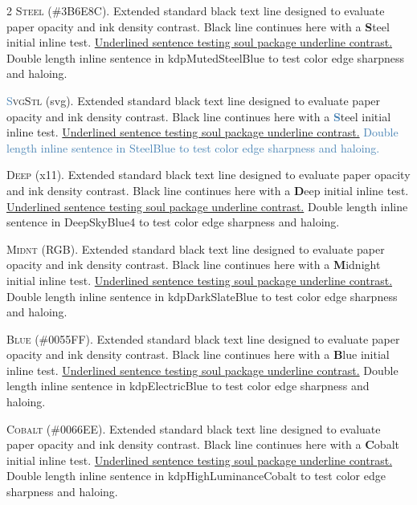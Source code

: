 \documentclass[9pt]{article}
\let\oldlettrine\lettrine
\renewcommand{\lettrine}[3][]{%
	\clubpenalty=10000
	\oldlettrine[#1]{#2}{#3}%
}
\begin{document}
\begin{multicols}{2}
\lettrine[lines=2]{\textcolor{kdpMutedSteelBlue}{S}}{teel} (\#3B6E8C). Extended standard black text line designed to evaluate paper opacity and ink density contrast. Black line continues here with a \textbf{\textcolor{kdpMutedSteelBlue}{S}}teel initial inline test. \ul{Underlined sentence testing soul package underline contrast.} \textcolor{kdpMutedSteelBlue}{Double length inline sentence in kdpMutedSteelBlue to test color edge sharpness and haloing.}
\medskip

\lettrine[lines=2]{\textcolor{SteelBlue}{S}}{vgStl} (svg). Extended standard black text line designed to evaluate paper opacity and ink density contrast. Black line continues here with a \textbf{\textcolor{SteelBlue}{S}}teel initial inline test. \ul{Underlined sentence testing soul package underline contrast.} \textcolor{SteelBlue}{Double length inline sentence in SteelBlue to test color edge sharpness and haloing.}
\medskip

\lettrine[lines=2]{\textcolor{DeepSkyBlue4}{D}}{eep} (x11). Extended standard black text line designed to evaluate paper opacity and ink density contrast. Black line continues here with a \textbf{\textcolor{DeepSkyBlue4}{D}}eep initial inline test. \ul{Underlined sentence testing soul package underline contrast.} \textcolor{DeepSkyBlue4}{Double length inline sentence in DeepSkyBlue4 to test color edge sharpness and haloing.}
\medskip

\lettrine[lines=2]{\textcolor{kdpDarkSlateBlue}{M}}{idnt} (RGB). Extended standard black text line designed to evaluate paper opacity and ink density contrast. Black line continues here with a \textbf{\textcolor{kdpDarkSlateBlue}{M}}idnight initial inline test. \ul{Underlined sentence testing soul package underline contrast.} \textcolor{kdpDarkSlateBlue}{Double length inline sentence in kdpDarkSlateBlue to test color edge sharpness and haloing.}
\medskip

\lettrine[lines=2]{\textcolor{kdpElectricBlue}{B}}{lue} (\#0055FF). Extended standard black text line designed to evaluate paper opacity and ink density contrast. Black line continues here with a \textbf{\textcolor{kdpElectricBlue}{B}}lue initial inline test. \ul{Underlined sentence testing soul package underline contrast.} \textcolor{kdpElectricBlue}{Double length inline sentence in kdpElectricBlue to test color edge sharpness and haloing.}
\medskip

\lettrine[lines=2]{\textcolor{kdpHighLuminanceCobalt}{C}}{obalt} (\#0066EE). Extended standard black text line designed to evaluate paper opacity and ink density contrast. Black line continues here with a \textbf{\textcolor{kdpHighLuminanceCobalt}{C}}obalt initial inline test. \ul{Underlined sentence testing soul package underline contrast.} \textcolor{kdpHighLuminanceCobalt}{Double length inline sentence in kdpHighLuminanceCobalt to test color edge sharpness and haloing.}
\medskip


\end{multicols}
\end{document}
